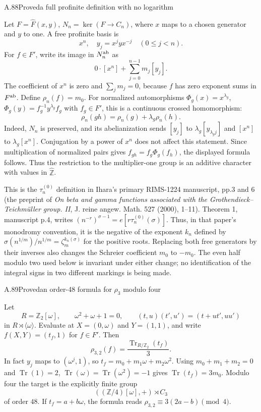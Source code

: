 \begin{statement}{A.88}{Proved}{a full profinite definition with no logarithm}
\citep[Theorem 1 and Section 2]{LitIhara2000BetaGammaII}
\end{statement}
Let $F=\widehat F(x,y)$, $N_n=\ker(F\to C_n)$, where $x$ maps
to a chosen generator and $y$ to one.  A free profinite basis is
\[
 x^n,\quad y_j=x^jyx^{-j}\quad(0\leq j<n).
\]
For $f\in F'$, write its image in $N_n^{\rm ab}$ as
\[
 0\cdot[x^n]+\sum_{j=0}^{n-1}m_j[y_j].
\]
The coefficient of $x^n$ is zero and $\sum_jm_j=0$, because
$f$ has zero exponent sums in $F^{\rm ab}$.
Define $\rho_n(f)=m_0$.
For normalized automorphisms $\Phi_g(x)=x^{\lambda_g}$,
$\Phi_g(y)=f_g^{-1}y^{\lambda_g}f_g$ with $f_g\in F'$, this is
a continuous crossed homomorphism:
\[
 \rho_n(gh)=\rho_n(g)+\lambda_g\rho_n(h).
\]
Indeed, $N_n$ is preserved, and its abelianization sends
$[y_j]$ to $\lambda_g[y_{\lambda_gj}]$ and $[x^n]$ to
$\lambda_g[x^n]$.  Conjugation by a power of $x^n$ does not
affect this statement.  Since multiplication of normalized pairs
gives $f_{gh}=f_g\Phi_g(f_h)$, the displayed formula follows.
Thus the restriction to the multiplier-one group is an additive
character with values in $\widehat{\mathbb Z}$.

This is the $\tau_n^{(0)}$ definition in Ihara's primary
RIMS-1224 manuscript, pp.3 and 6 (the preprint of
\emph{On beta and gamma functions associated with the
Grothendieck--Teichm\"uller group. II}, J. reine angew. Math.
527 (2000), 1--11). Theorem 1, manuscript p.4, writes
$(n^{-r})^{\sigma-1}=e[r\tau_n^{(0)}(\sigma)]$.
Thus, in that paper's monodromy convention, it is the negative
of the exponent $k_n$ defined by
$\sigma(n^{1/m})/n^{1/m}=\zeta_m^{k_n(\sigma)}$ for the positive roots.
Replacing both free generators by their inverses also changes the
Schreier coefficient $m_0$ to $-m_0$.
The even half modulo two used below is invariant under either change;
no identification of the integral signs in two different markings
is being made.

\begin{statement}{A.89}{Proved}{an order-48 formula for $\rho_3$ modulo four}
\citep[p.~657]{LitSchneps2006}
\end{statement}
Let
\[
 R=\mathbb Z_2[\omega],\qquad \omega^2+\omega+1=0,
 \qquad (t,u)(t',u')=(t+ut',uu')
\]
in $R\rtimes\langle\omega\rangle$.  Evaluate at
$X=(0,\omega)$ and $Y=(1,1)$, and write
$f(X,Y)=(t_f,1)$ for $f\in F'$.  Then
\[
 \rho_{3,2}(f)=\frac{\operatorname{Tr}_{R/\mathbb Z_2}(t_f)}3.
 \tag{A.89}
\]
In fact $y_j$ maps to $(\omega^j,1)$, so
$t_f=m_0+m_1\omega+m_2\omega^2$.
Using $m_0+m_1+m_2=0$ and
$\operatorname{Tr}(1)=2$, $\operatorname{Tr}(\omega)
=\operatorname{Tr}(\omega^2)=-1$ gives
$\operatorname{Tr}(t_f)=3m_0$.
Modulo four the target is the explicitly finite group
\[
 ((\mathbb Z/4)[\omega],+)\rtimes C_3
\]
of order $48$.  If $t_f=a+b\omega$, the formula reads
$\rho_{3,2}\equiv3(2a-b)\pmod4$.

